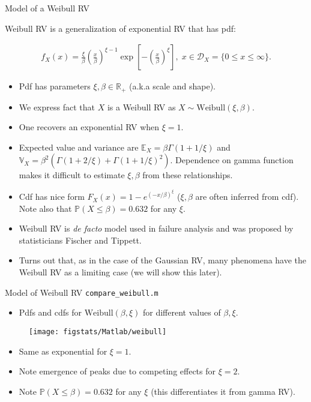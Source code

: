 \documentclass[9pt]{beamer}
\begin{document}
%
\begin{frame}{Model of a Weibull RV}

Weibull RV is a generalization of exponential RV that has pdf:
\begin{block}{}
\begin{align*}
f_X(x)=\frac{\xi}{\beta}\left(\frac{x}{\beta}\right)^{\xi-1}\exp\left[{-\left(\frac{x}{\beta}\right)^\xi}\right],\; x\in \mathcal{D}_X=\{0\leq x\leq \infty\}.
\end{align*}
\end{block}
\begin{itemize}
\setlength{\itemsep}{5pt}
\item Pdf has parameters $\xi,\beta\in \mathbb{R}_+$ (a.k.a scale and shape).
\item We express fact that $X$ is a Weibull RV as $X\sim \textrm{Weibull}(\xi,\beta)$.
\item One recovers an exponential RV when $\xi=1$. 
\item Expected value and variance are $\mathbb{E}_X=\beta\Gamma(1+1/\xi)$ and $\mathbb{V}_X=\beta^2\left(\Gamma(1+2/\xi)+\Gamma(1+1/\xi)^2\right)$. Dependence on gamma function makes it difficult to estimate $\xi,\beta$ from these relationships. 
\item Cdf has nice form $F_X(x)=1-e^{(-x/\beta)^\xi}$ ($\xi,\beta$ are often inferred from cdf). Note also that $\mathbb{P}(X\leq \beta)=0.632$ for any $\xi$. 
\item Weibull RV is {\em de facto} model used in failure analysis and was proposed by statisticians Fischer and Tippett. 
\item Turns out that, as in the case of the Gaussian RV, many phenomena have the Weibull RV as a limiting case (we will show this later). 
\end{itemize}

\end{frame}

%
\begin{frame}{Model of Weibull RV \footnotesize{\texttt{compare\_weibull.m}}}
\begin{itemize}
\item Pdfs and cdfs for $\textrm{Weibull}(\beta,\xi)$ for different values of $\beta,\xi$.
\end{itemize}
\begin{figure}[!htb]
    \centering
	\texttt{[image: figstats/Matlab/weibull]}
\end{figure}
\begin{itemize}
\item Same as exponential for $\xi=1$.
\item Note emergence of peaks due to competing effects for $\xi=2$. 
\item Note $\mathbb{P}(X\leq \beta)=0.632$ for any $\xi$ (this differentiates it from gamma RV).
\end{itemize}
\end{frame}
\end{document}
